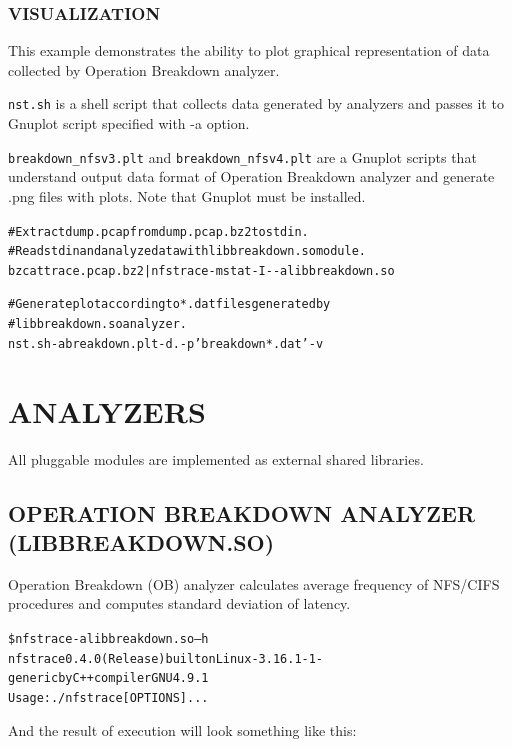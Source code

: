 \documentclass[oneside]{article}
\newcommand{\code}[1]{\texttt{#1}}
\newcommand{\includetext}[1]{
\begin{alltt}
    \small{}
\end{alltt}
}
\newcommand{\gls}{}
\begin{document}
\subsubsection{VISUALIZATION}
\label{sec:visualization}

This example demonstrates the ability to plot graphical representation of data
collected by Operation Breakdown analyzer.

\code{nst.sh} is a shell script that collects data generated by analyzers and
passes it to \gls{Gnuplot} script specified with -a option.  

\code{breakdown\_nfsv3.plt} and \code{breakdown\_nfsv4.plt} are a \gls{Gnuplot}
scripts that understand output data format of Operation Breakdown analyzer and
generate .png files with plots.  Note that \gls{Gnuplot} must be installed.

\begin{minipage}[t]{\linewidth}
\begin{alltt}
\# Extract dump.pcap from dump.pcap.bz2 to stdin.
\# Read stdin and analyze data with libbreakdown.so module. 
bzcat trace.pcap.bz2 | nfstrace -m stat -I - -a libbreakdown.so

\# Generate plot according to *.dat files generated by
\# libbreakdown.so analyzer. 
nst.sh -a breakdown.plt -d . -p 'breakdown*.dat' -v
\end{alltt} 
\end{minipage}

\section{ANALYZERS}

All pluggable modules are implemented as external shared libraries.

\subsection{OPERATION BREAKDOWN ANALYZER (LIBBREAKDOWN.SO)}

Operation Breakdown (OB) analyzer calculates average frequency of NFS/CIFS
procedures and computes standard deviation of latency.

\begin{alltt} 
\$ nfstrace -a libbreakdown.so –h
nfstrace 0.4.0 (Release) built on Linux-3.16.1-1-generic by C++ compiler GNU 4.9.1 
Usage: ./nfstrace [OPTIONS]... 
\end{alltt}
And the result of execution will look something like this:
\includetext{nfstrace_manual_includes/breakdown_output.txt}
\end{document}
